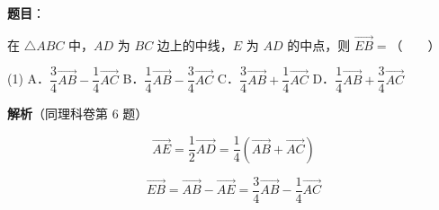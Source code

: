 \begin{answer}

\textbf{题目}：

在 $\triangle ABC$ 中，$AD$ 为 $BC$ 边上的中线，$E$ 为 $AD$ 的中点，则 $\overrightarrow{EB}=$\mbox{（　　）}

\begin{gkopts}(1)
\task A．$\dfrac34\overrightarrow{AB}-\dfrac14\overrightarrow{AC}$
\task B．$\dfrac14\overrightarrow{AB}-\dfrac34\overrightarrow{AC}$
\task C．$\dfrac34\overrightarrow{AB}+\dfrac14\overrightarrow{AC}$
\task D．$\dfrac14\overrightarrow{AB}+\dfrac34\overrightarrow{AC}$
\end{gkopts}

\textbf{解析}（同理科卷第 6 题）

\nopagebreak[4]
\[\overrightarrow{AE}=\frac12\overrightarrow{AD}=\frac14\left(\overrightarrow{AB}+\overrightarrow{AC}\right)\]

\nopagebreak[4]
\[\overrightarrow{EB}=\overrightarrow{AB}-\overrightarrow{AE}=\frac34\overrightarrow{AB}-\frac14\overrightarrow{AC}\]


\par\medskip

\end{answer}
